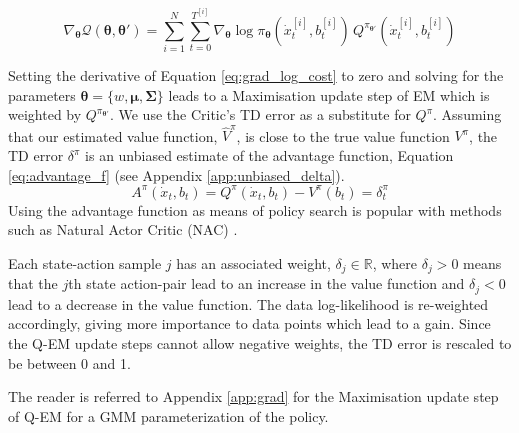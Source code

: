 \documentclass[final,3p,times,twocolumn]{elsarticle}
\newcommand{\B}{b}
\newcommand{\U}{\dot{x}}
\newcommand{\Param}{\boldsymbol{\theta}}
\begin{document}
\begin{equation} \label{eq:grad_log_cost}
  \nabla_{\Param}\mathcal{Q}(\Param,\Param') = \sum\limits_{i=1}^{N} \sum\limits_{t=0}^{T^{[i]}} \nabla_{\Param}\log \pi_{\Param}(\U^{[i]}_t,\B^{[i]}_t) \, Q^{\pi_{\Param'}}(\U^{[i]}_t,\B^{[i]}_t)
\end{equation}

Setting the derivative of Equation \ref{eq:grad_log_cost} to zero and solving for the parameters
$\Param=\{w,\boldsymbol{\mu},\boldsymbol{\Sigma}\}$ leads to a Maximisation update step of EM
which is weighted by $Q^{\pi_{\Param'}}$.
We use the Critic's TD error as a substitute for $Q^{\pi}$. Assuming that our estimated value function, $\hat{V}^{\pi}$, 
is close to the true value function $V^{\pi}$, the TD error $\delta^{\pi}$ is an unbiased estimate of the advantage function, Equation \ref{eq:advantage_f} 
(see Appendix \ref{app:unbiased_delta}).
\begin{equation}\label{eq:advantage_f}
 A^{\pi}(\U_t,\B_t) =  Q^{\pi}(\U_t,\B_t) - V^{\pi}(\B_t) = \delta^{\pi}_t
\end{equation}
Using the advantage function as means of policy search is popular with methods such as
Natural Actor Critic (NAC) \cite{peter_nac_2008}.

Each state-action sample $j$ has an associated weight, $\delta_j \in \mathbb{R}$, where $\delta_j > 0$ means that the 
$j$th state action-pair lead to an increase in the value function and $\delta_j < 0$ lead to 
a decrease in the value function. The data log-likelihood is re-weighted accordingly, giving more importance to data points which lead to a gain. Since 
the Q-EM update steps cannot allow negative weights, the TD error is rescaled to be between 0 and 1. %

The reader is referred to Appendix \ref{app:grad} for the Maximisation update step of Q-EM for a 
GMM parameterization of the policy.
\end{document}
